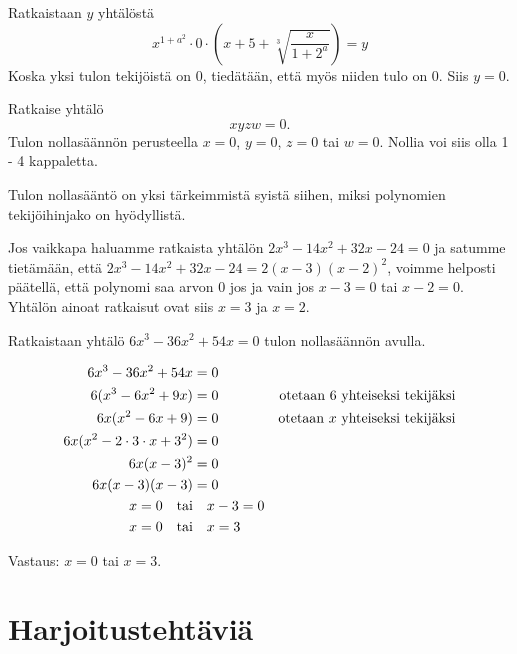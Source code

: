 
\begin{esimerkki} Ratkaistaan $y$ yhtälöstä
    \[x^{1+a^2}\cdot 0\cdot\left(x+5+\sqrt[3]{\frac{x}{1+2^a}}\right)=y\]
    Koska yksi tulon tekijöistä on $0$, tiedätään, että myös niiden tulo on $0$.
    Siis $y=0$.
\end{esimerkki}

\begin{esimerkki} Ratkaise yhtälö
    \[xyzw=0.\]
Tulon nollasäännön perusteella $x=0$, $y=0$, $z=0$ tai $w=0$. Nollia voi siis
olla 1 - 4 kappaletta.
\end{esimerkki}

Tulon nollasääntö on yksi tärkeimmistä syistä siihen, miksi polynomien tekijöihinjako on hyödyllistä.

Jos vaikkapa haluamme ratkaista yhtälön $2x^3-14x^2+32x-24=0$ ja satumme tietämään, että $2x^3-14x^2+32x-24=2(x-3)(x-2)^2$,
voimme helposti päätellä, että polynomi saa arvon $0$ jos ja vain jos $x-3=0$ tai $x-2=0$. Yhtälön ainoat ratkaisut ovat siis $x=3$ ja $x=2$.

\begin{esimerkki}
Ratkaistaan yhtälö $6x^3-36x^2+54x=0$ tulon nollasäännön avulla.

\begin{align*}
6x^3-36x^2+54x &= 0 \\
6(x^3-6x^2+9x) &= 0 \ \ \ \ &\text{otetaan } 6 \text{ yhteiseksi tekijäksi} \\
6x(x^2-6x+9) &= 0 &\text{otetaan } x \text{ yhteiseksi tekijäksi} \\
6x(x^2-2\cdot 3\cdot x+3^2)  &= 0 \\
6x(x-3)^2 &= 0 \\
6x(x-3)(x-3) &= 0 \\
x=0 \textrm{\quad tai}& \quad x-3=0 \\
x=0 \textrm{\quad tai}& \quad x=3
\end{align*}

Vastaus: $x=0$ tai $x=3$.
\end{esimerkki}

\section{Harjoitustehtäviä}

